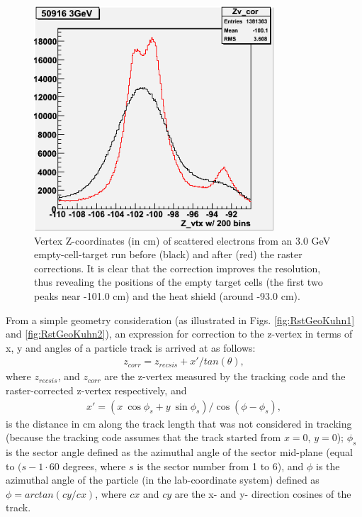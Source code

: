 \begin{figure}[h] 
\centering
  \leavevmode \includegraphics[width=0.8\textwidth]{figuresEG4/FigKineCor/MTc3G50916one.png}   
  \caption[Vz from Empty target run]{Vertex Z-coordinates (in cm) of scattered electrons from an 3.0 GeV empty-cell-target run before (black) and after (red) the raster corrections. It is clear that the correction improves the resolution, thus revealing the positions of the empty target cells (the first two peaks near -101.0 cm) and the heat shield (around -93.0 cm).}
  \label{fig:MTcellVz1}
\end{figure}



From a simple geometry consideration (as illustrated in Figs. \ref{fig:RstGeoKuhn1} and \ref{fig:RstGeoKuhn2}), an expression for correction to the z-vertex in terms of x, y and angles of a particle track is arrived at as follows:
\begin{eqnarray}
\label{eqRC-zcor}
z_{corr} = z_{recsis} + x'/tan(\theta),
\end{eqnarray}
where $z_{recsis}$, and $z_{corr}$ are the z-vertex measured %
by the tracking code and the raster-corrected z-vertex respectively, and
\begin{eqnarray}
\label{eqRC-xprime}
x' = (x~\cos\phi_s + y~\sin\phi_s)/\cos(\phi - \phi_s),
\end{eqnarray}
is the distance in cm along the track length that was not considered in tracking (because the tracking code assumes that the track started from $x = 0$, $y = 0$); $\phi_s$ is the sector angle defined as the azimuthal angle of the sector mid-plane (equal to $(s-1 \cdot 60$ degrees, where $s$ is the sector number from 1 to 6), and $\phi$ is the azimuthal angle of the particle (in the lab-coordinate system) defined as $\phi = arctan(cy/cx)$, %
where $cx$ and $cy$ are the x- and y- direction cosines of the track. 

